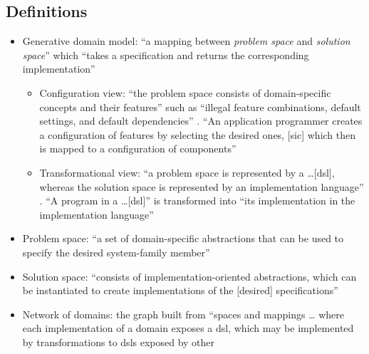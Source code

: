 \subsection{Definitions}
\begin{itemize}
      \item Generative domain model: ``a mapping between \emph{problem space}
            and \emph{solution space}'' which ``takes a specification and
            returns the corresponding implementation''
            \citep[p.~330]{czarnecki_overview_2004}
            \begin{itemize}
                  \item Configuration view: ``the problem space consists of
                        domain-specific concepts and their features'' such as
                        ``illegal feature combinations, default settings, and
                        default dependencies'' \citep[p.~331]{czarnecki_overview_2004}.
                        ``An application programmer creates a configuration of
                        features by selecting the desired ones, [sic] which
                        then is mapped to a configuration of components''
                        \citep[p.~331]{czarnecki_overview_2004}
                  \item Transformational view: ``a problem space is represented
                        by a \dots [\acs{dsl}], whereas the solution space is
                        represented by an implementation language''
                        \citep[p.~331]{czarnecki_overview_2004}. ``A program in
                        a \dots [\acs{dsl}]'' is transformed into ``its
                        implementation in the implementation language''
                        \citep[p.~331]{czarnecki_overview_2004}
            \end{itemize}
      \item Problem space: ``a set of domain-specific abstractions that can be
            used to specify the desired system-family member''
            \citep[p.~330]{czarnecki_overview_2004}
      \item Solution space: ``consists of implementation-oriented abstractions,
            which can be instantiated to create implementations of the [desired]
            specifications'' \citep[p.~330]{czarnecki_overview_2004}
      \item Network of domains: the graph built from ``spaces and mappings \dots
            where each implementation of a domain exposes a \acs{dsl}, which may
            be implemented by transformations to \acsp{dsl} exposed by other

\end{itemize}
